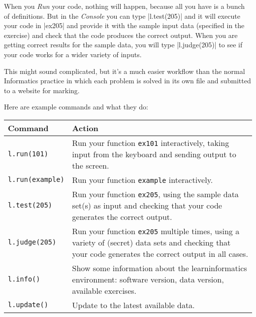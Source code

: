 When you \emph{Run} your code, nothing will happen, because all you have is a bunch of
definitions. But in the \emph{Console} you can type \pycode|l.test(205)| and it will
execute your code in \pycode|ex205| and provide it with the sample input data (specified
in the exercise) and check that the code produces the correct output. When you are getting
correct results for the sample data, you will type \pycode|l.judge(205)| to see if your
code works for a wider variety of inputs.

This might sound complicated, but it's a much easier workflow than the normal Informatics
practice in which each problem is solved in its own file and submitted to a website for
marking.

Here are example commands and what they do:
\begin{center}
  \begin{tabular}{lp{10cm}}
    \toprule
    \textbf{Command} & \textbf{Action} \\
    \midrule
    \texttt{l.run(101)}     & Run your function \texttt{ex101} interactively, taking
                              input from the keyboard and sending output to the
                              screen.\\[3pt]
    \texttt{l.run(example)} & Run your function \texttt{example} interactively.\\[3pt]
    \texttt{l.test(205)}    & Run your function \texttt{ex205}, using the sample data
                              set(s) as input and checking that your code generates
                              the correct output.\\[3pt]
    \texttt{l.judge(205)}   & Run your function \texttt{ex205} multiple times, using a
                              variety of (secret) data sets and checking that your code
                              generates the correct output in all cases.\\
    \midrule
    \texttt{l.info()}       & Show some information about the learninformatics
                              environment: software version, data version, available
                              exercises.\\
    \texttt{l.update()}     & Update to the latest available data.\\
    \bottomrule
  \end{tabular}
\end{center}
